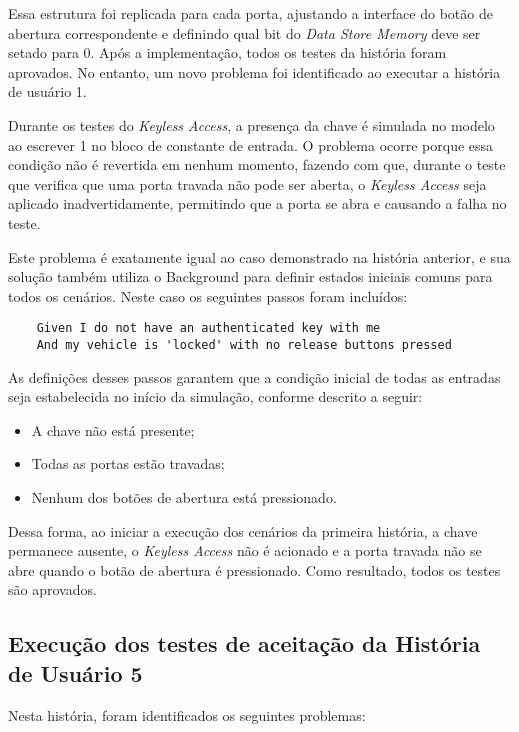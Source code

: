 Essa estrutura foi replicada para cada porta, ajustando a interface do botão de abertura correspondente e definindo qual bit do \textit{Data Store Memory} deve ser setado 
para 0. Após a implementação, todos os testes da história foram aprovados. No entanto, um novo problema foi identificado ao executar a história de usuário 1.

Durante os testes do \textit{Keyless Access}, a presença da chave é simulada no modelo ao escrever 1 no bloco de constante de entrada. O problema ocorre porque essa 
condição não é revertida em nenhum momento, fazendo com que, durante o teste que verifica que uma porta travada não pode ser aberta, o \textit{Keyless Access} seja 
aplicado inadvertidamente, permitindo que a porta se abra e causando a falha no teste.

Este problema é exatamente igual ao caso demonstrado na história anterior, e sua solução também utiliza o Background para definir estados iniciais comuns para todos 
os cenários. Neste caso os seguintes passos foram incluídos:

\begin{verbatim}
	Given I do not have an authenticated key with me
	And my vehicle is 'locked' with no release buttons pressed
\end{verbatim}

As definições desses passos garantem que a condição inicial de todas as entradas seja estabelecida no início da simulação, conforme descrito a seguir:

\begin{itemize}
	\item A chave não está presente;
	\item Todas as portas estão travadas;
	\item Nenhum dos botões de abertura está pressionado.
\end{itemize}

Dessa forma, ao iniciar a execução dos cenários da primeira história, a chave permanece ausente, o \textit{Keyless Access} não é acionado e a porta travada não se 
abre quando o botão de abertura é pressionado. Como resultado, todos os testes são aprovados.


\subsection{Execução dos testes de aceitação da História de Usuário 5}

Nesta história, foram identificados os seguintes problemas:

